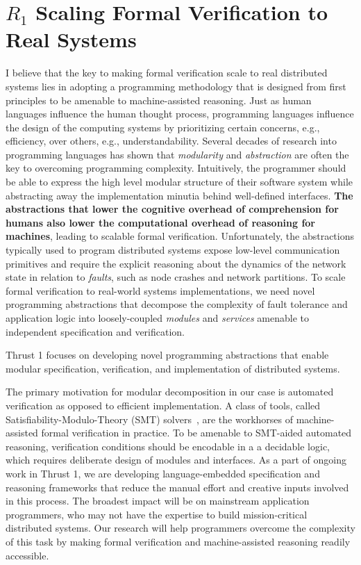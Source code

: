 \section*{$R_1$ Scaling Formal Verification to Real Systems}

I believe that the key to making formal verification scale to real
distributed systems lies in adopting a programming methodology that is
designed from first principles to be amenable to machine-assisted
reasoning. Just as human languages influence the human thought process,
programming languages influence the design of the computing systems by
prioritizing certain concerns, e.g., efficiency, over others, e.g.,
understandability. Several decades of research into programming languages
has shown that \emph{modularity} and \emph{abstraction} are often the key
to overcoming programming complexity. Intuitively, the programmer should be
able to express the high level modular structure of their software system
while abstracting away the implementation minutia behind well-defined
interfaces. \textbf{The abstractions that lower the cognitive overhead of
comprehension for humans also lower the computational overhead of reasoning
for machines}, leading to scalable formal verification. Unfortunately, the
abstractions typically used to program distributed systems expose low-level
communication primitives and require the explicit reasoning about the
dynamics of the network state in relation to \emph{faults}, such as node
crashes and network partitions. To scale formal verification to real-world
systems implementations, we need novel programming abstractions that
decompose the complexity of fault tolerance and application logic into
loosely-coupled \emph{modules} and \emph{services} amenable to independent
specification and verification.

\begin{mdquote}
Thrust 1 focuses on developing novel programming abstractions that enable
modular specification, verification, and implementation of distributed systems.
\end{mdquote}

The primary motivation for modular decomposition in our case is automated
verification as opposed to efficient implementation. A class of tools,
called Satisfiability-Modulo-Theory (SMT) solvers~\cite{smt-primer}, are
the workhorses of machine-assisted formal verification in practice. To be
amenable to SMT-aided automated reasoning, verification conditions should
be encodable in a a decidable logic, which requires deliberate design of
modules and interfaces. As a part of ongoing work in Thrust 1, we are
developing language-embedded specification and reasoning frameworks that
reduce the manual effort and creative inputs involved in this process. The
broadest impact will be on mainstream application programmers, who may not
have the expertise to build mission-critical distributed systems. Our
research will help programmers overcome the complexity of this task by
making formal verification and machine-assisted reasoning readily
accessible. 

